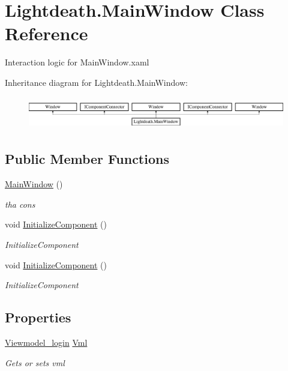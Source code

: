 \hypertarget{class_lightdeath_1_1_main_window}{}\section{Lightdeath.\+Main\+Window Class Reference}
\label{class_lightdeath_1_1_main_window}


Interaction logic for Main\+Window.\+xaml  


Inheritance diagram for Lightdeath.\+Main\+Window\+:\begin{figure}[H]
\begin{center}
\leavevmode
\includegraphics[height=1.454545cm]{class_lightdeath_1_1_main_window}
\end{center}
\end{figure}
\subsection*{Public Member Functions}
\begin{DoxyCompactItemize}
\item 
\hyperlink{class_lightdeath_1_1_main_window_a475965b66868ac540ab27674cc60d6e0}{Main\+Window} ()
\begin{DoxyCompactList}\small\item\em tha cons \end{DoxyCompactList}\item 
void \hyperlink{class_lightdeath_1_1_main_window_a45aa2740eadb2180828832d1994a1307}{Initialize\+Component} ()
\begin{DoxyCompactList}\small\item\em Initialize\+Component \end{DoxyCompactList}\item 
void \hyperlink{class_lightdeath_1_1_main_window_a45aa2740eadb2180828832d1994a1307}{Initialize\+Component} ()
\begin{DoxyCompactList}\small\item\em Initialize\+Component \end{DoxyCompactList}\end{DoxyCompactItemize}
\subsection*{Properties}
\begin{DoxyCompactItemize}
\item 
\hyperlink{class_lightdeath_1_1_viewmodel__login}{Viewmodel\+\_\+login} \hyperlink{class_lightdeath_1_1_main_window_a20f7b90c8fb41a8c0001ab02d2b37044}{Vml}
\begin{DoxyCompactList}\small\item\em Gets or sets vml \end{DoxyCompactList}\end{DoxyCompactItemize}


